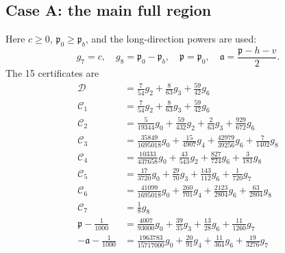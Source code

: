 \documentclass[11pt,a4paper]{article}
\numberwithin{equation}{section}
\theoremstyle{remark}
\begin{document}
\subsection{Case A: the main full region}
Here $c\ge0$, $\mathfrak p_0\ge\mathfrak p_b$, and the long-direction
powers are used:
\[
 g_7=c,\quad g_8=\mathfrak p_0-\mathfrak p_b,\quad
 \mathfrak p=\mathfrak p_0,\quad
 \mathfrak a=\frac{\mathfrak p-h-v}{2}.
\]
The 15 certificates are
\begingroup
\small
\begin{align}
\mathcal D &= \frac{7}{54}g_{2}+\frac{8}{63}g_{3}+\frac{59}{42}g_{6}\label{cert:main:1}\\
\mathcal C_1 &= \frac{7}{54}g_{2}+\frac{8}{63}g_{3}+\frac{59}{42}g_{6}\label{cert:main:2}\\
\mathcal C_2 &= \frac{5}{19344}g_{0}+\frac{59}{432}g_{2}+\frac{2}{63}g_{3}+\frac{929}{672}g_{6}\label{cert:main:3}\\
\mathcal C_3 &= \frac{35849}{1695018}g_{0}+\frac{15}{4907}g_{4}+\frac{42979}{39256}g_{6}+\frac{7}{1402}g_{8}\label{cert:main:4}\\
\mathcal C_4 &= \frac{10333}{437658}g_{0}+\frac{43}{543}g_{2}+\frac{827}{724}g_{6}+\frac{3}{181}g_{8}\label{cert:main:5}\\
\mathcal C_5 &= \frac{17}{3720}g_{0}+\frac{29}{70}g_{3}+\frac{143}{112}g_{6}+\frac{1}{720}g_{7}\label{cert:main:6}\\
\mathcal C_6 &= \frac{41099}{1695018}g_{0}+\frac{260}{701}g_{4}+\frac{2123}{2804}g_{6}+\frac{63}{2804}g_{8}\label{cert:main:7}\\
\mathcal C_7 &= \frac{1}{8}g_{8}\label{cert:main:8}\\
\mathfrak p-\frac1{1000} &= \frac{4007}{93000}g_{0}+\frac{39}{35}g_{3}+\frac{13}{28}g_{6}+\frac{11}{1260}g_{7}\label{cert:main:9}\\
-\mathfrak a-\frac1{1000} &= \frac{1963783}{15717000}g_{0}+\frac{20}{91}g_{4}+\frac{11}{364}g_{6}+\frac{19}{3276}g_{7}\label{cert:main:10}\\

\end{align}
\end{document}
